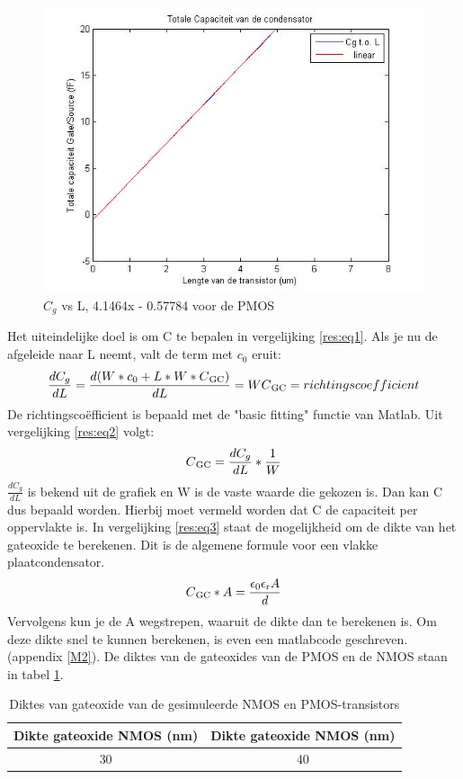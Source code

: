 \documentclass{report}
\begin{document}
\begin{figure} [h!]
\centering
\includegraphics [scale = 0.4] {../figures/c0p.jpg}
\caption{$C_g$ vs L, 4.1464x - 0.57784 voor de PMOS}
\label{res:4}
\end{figure}
Het uiteindelijke doel is om C te bepalen in vergelijking \ref{res:eq1}. Als je nu de afgeleide naar L neemt, valt de term met $c_0$ eruit:
\begin{equation} \label{res:eq2}
\frac{dC_g}{dL} = \frac{d(W *c_0 + L *W *C\textsubscript{GC})}{dL} = WC\textsubscript{GC} =richtingscoefficient
\end{equation}
De richtingscoëfficient is bepaald met de "basic fitting" functie van Matlab. Uit vergelijking \ref{res:eq2} volgt: 
\begin{equation} \label{res:eq3}
C\textsubscript{GC}= \frac{dC_g}{dL}*\frac{1}{W}
\end{equation}
$\frac{dC_g}{dL}$ is bekend uit de grafiek en W is de vaste waarde die gekozen is. Dan kan C dus bepaald worden. Hierbij moet vermeld worden dat C de capaciteit per oppervlakte is. In vergelijking \ref{res:eq3} staat de mogelijkheid om de dikte van het gateoxide te berekenen. Dit is de algemene formule voor een vlakke plaatcondensator.
\begin{equation} \label{res:eq3}
C\textsubscript{GC}*A = \frac { \epsilon \textsubscript{0} \epsilon \textsubscript{r}A } {d}
\end{equation}
Vervolgens kun je de A wegstrepen, waaruit de dikte dan te berekenen is. Om deze dikte snel te kunnen berekenen, is even een matlabcode geschreven. (appendix \ref{M2}). De diktes van de gateoxides van de PMOS en de NMOS staan in tabel \ref{res:tab1}.
\begin{table} [h!]
 \begin{tabular}{ | c |c| } 
\hline
  Dikte gateoxide NMOS (nm) & Dikte gateoxide NMOS (nm) \\ \hline
  30  & 40  \\ \hline
\end{tabular}
\caption{Diktes van gateoxide van de gesimuleerde NMOS en PMOS-transistors}
\label{res:tab1}
 \end{table}
\end{document}
